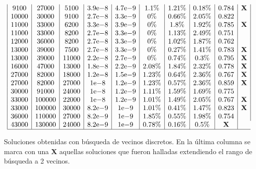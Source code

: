 \documentclass{llncs}
\newcommand{\expnumber}[2]{{#1}\mathrm{e}{#2}}
\begin{document}
\begin{table}[H]
$$\begin{array}{|c|c|c|c|c|c|c|c|c|c|}
		9100 & 27000 & 5100 & \expnumber{3.9}{-8} & \expnumber{4.7}{-9} & 1.1\% & 1.21\% & 0.18\% & 0.784 & \textbf{X} \\
		10000 & 30000 & 9100 & \expnumber{2.7}{-8} & \expnumber{3.3}{-9} & 0\% & 0.66\% & 2.05\% & 0.822 & \\
		11000 & 33000 & 6200 & \expnumber{3.3}{-8} & \expnumber{3.9}{-9} & 0\% & 1.8\% & 1.92\% & 0.785 & \textbf{X} \\
		11000 & 33000 & 8200 & \expnumber{2.7}{-8} & \expnumber{3.3}{-9}  & 0\% & 1.13\% & 2.49\% & 0 .751&\\
		12000 & 36000 & 8200 & \expnumber{2.7}{-8} & \expnumber{3.3}{-9}  & 0\% & 1.02\% & 1.87\% & 0.762 & \\
		13000 & 39000 & 7500 & \expnumber{2.7}{-8} & \expnumber{3.3}{-9} & 0\% & 0.27\% & 1.41\% & 0.783 & \textbf{X} \\
		13000 & 39000 & 11000 & \expnumber{2.2}{-8} & \expnumber{2.7}{-9} & 0\% & 0.74\% & 0.3\% & 0.795 & \textbf{X} \\
		16000 & 47000 & 13000 & \expnumber{1.8}{-8} & \expnumber{2.2}{-9} & 2.08\% & 1.84\% & 2.32\% & 0.778 & \textbf{X} \\ 
		27000 & 82000 & 18000 & \expnumber{1.2}{-8} & \expnumber{1.5}{-9} & 1.23\% & 0.64\% & 2.36\% & 0.767 & \textbf{X} \\ 
		27000 & 82000 & 27000 & \expnumber{1}{-8} & \expnumber{1.2}{-9} & 1.23\% & 0.57\% & 2.36\% & 0.859 & \textbf{X} \\
		30000 & 91000 & 24000 & \expnumber{1}{-8} & \expnumber{1.2}{-9}  & 1.11\% & 1.59\% & 1.69\% & 0.775 & \\
		33000 & 100000 & 22000 & \expnumber{1}{-8} & \expnumber{1.2}{-9} & 1.01\% & 1.49\% & 2.05\% & 0.767 & \textbf{X} \\
		33000 & 100000 & 30000 & \expnumber{8.2}{-9} & \expnumber{1}{-9} & 1.01\% & 0.41\% & 1.47\% & 0.823 & \textbf{X} \\
		36000 & 110000 & 27000 & \expnumber{8.2}{-9} & \expnumber{1}{-9}  & 1.85\% & 0.55\% & 1.98\% & 0.754 & \\
		43000 & 130000 & 24000 & \expnumber{8.2}{-9} & \expnumber{1}{-9} & 0.78\% & 0.16\% & 0.5\% & \textbf{X} \\
		\hline
		\end{array}
		$$
		\caption{Soluciones obtenidas con búsqueda de vecinos discretos. En la última columna se marca con una \textbf{X} aquellas
		soluciones que fueron halladas extendiendo el rango de búsqueda a 2 vecinos.}
		\label{cuadroSolVecinos}
	\end{table}
	
\end{document}
